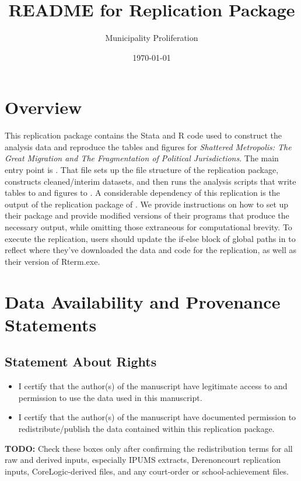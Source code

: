 \documentclass[11pt]{article}
\title{README for Replication Package}
\author{Municipality Proliferation}
\date{\today}
\newcommand{\todo}[1]{\textbf{TODO:} #1}
\begin{document}
\maketitle

\section*{Overview}

This replication package contains the Stata and R code used to construct the analysis data and reproduce the tables and figures for \textit{Shattered Metropolis: The Great Migration and
The Fragmentation of Political Jurisdictions}. The main entry point is . That file sets up the file structure of the replication package, constructs cleaned/interim datasets, and then runs the analysis scripts that write tables to  and figures to . A considerable dependency of this replication is the output of the replication package of \citet{derenoncourt2022}. We provide instructions on how to set up their package and provide modified versions of their programs that produce the necessary output, while omitting those extraneous for computational brevity. To execute the replication, users should update the if-else block of global paths in  to reflect where they've downloaded the data and code for the replication, as well as their version of Rterm.exe.

\section*{Data Availability and Provenance Statements}

\subsection*{Statement About Rights}

\begin{itemize}
  \item[$\square$] I certify that the author(s) of the manuscript have legitimate access to and permission to use the data used in this manuscript.
  \item[$\square$] I certify that the author(s) of the manuscript have documented permission to redistribute/publish the data contained within this replication package.
\end{itemize}

\todo{Check these boxes only after confirming the redistribution terms for all raw and derived inputs, especially IPUMS extracts, Derenoncourt replication inputs, CoreLogic-derived files, and any court-order or school-achievement files.}
\end{document}
